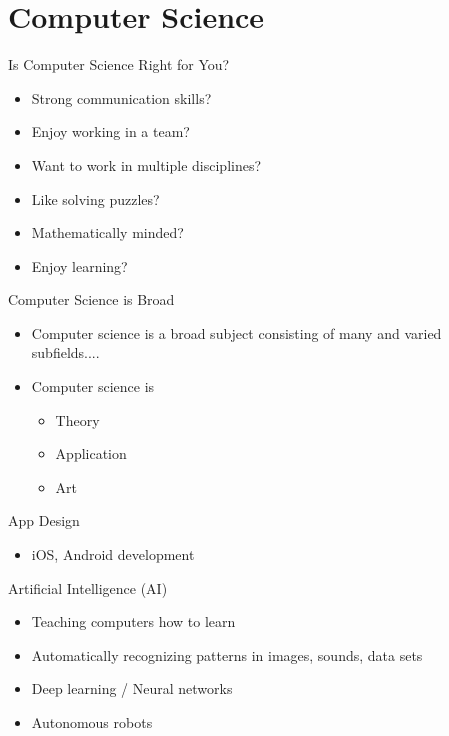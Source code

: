 \documentclass{beamer}
\begin{document}
\section{Computer Science}
\begin{frame}{Is Computer Science Right for You?}
\begin{itemize}
	\item Strong communication skills?
	\item Enjoy working in a team?
	\item Want to work in multiple disciplines?
	\item Like solving puzzles?
	\item Mathematically minded?
	\item Enjoy learning?
\end{itemize}
\end{frame}

\begin{frame}{Computer Science is Broad}
\begin{itemize}
	\item Computer science is a broad subject consisting of many and varied subfields....
	\item Computer science is
	\begin{itemize}
		\item Theory
		\item Application
		\item Art
	\end{itemize}
\end{itemize}
\end{frame}

\begin{frame}{App Design}
\begin{itemize}
	\item iOS, Android development
\end{itemize}
\end{frame}

\begin{frame}{Artificial Intelligence (AI)}
\begin{itemize}
	\item Teaching computers how to learn
	\item Automatically recognizing patterns in images, sounds, data sets
	\item Deep learning / Neural networks
	\item Autonomous robots
\end{itemize}
\end{frame}
\end{document}
